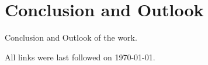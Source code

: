 \documentclass[
a4paper,
twoside,
bibliography=totoc,
headsepline,
cleardoublepage=empty,
parskip=half,
draft=false
]{scrbook}
\begin{document}
	\chapter{Conclusion and Outlook} \label{ch:conclusion_and_outlook}
	
		Conclusion and Outlook of the work.
		
	\clearpage
	
	
	
%	
%	
%	
%	
%	
%	
%	
%	
%	
%	
%	
	
	
	
	\printbibliography
	
	All links were last followed on \today.
	
	\pagestyle{empty}
	\renewcommand*{\chapterpagestyle}{empty}
	\Versicherung
\end{document}
